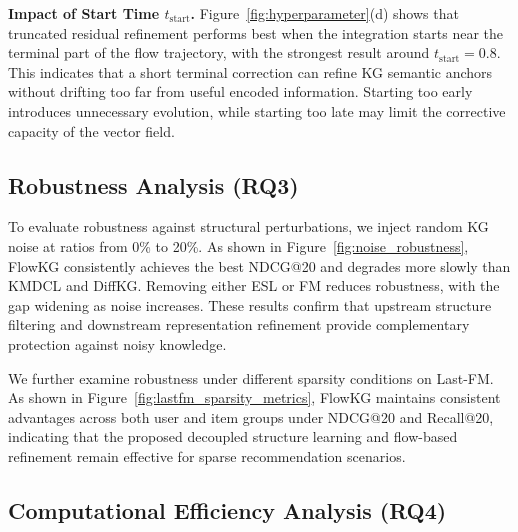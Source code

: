 \noindent\textbf{Impact of Start Time $t_{\mathrm{start}}$.}
Figure~\ref{fig:hyperparameter}(d) shows that truncated residual refinement performs best when the integration starts near the terminal part of the flow trajectory, with the strongest result around $t_{\mathrm{start}}=0.8$. This indicates that a short terminal correction can refine KG semantic anchors without drifting too far from useful encoded information. Starting too early introduces unnecessary evolution, while starting too late may limit the corrective capacity of the vector field.

\subsection{Robustness Analysis (RQ3)}


To evaluate robustness against structural perturbations, we inject random KG noise at ratios from 0\% to 20\%. As shown in Figure~\ref{fig:noise_robustness}, FlowKG consistently achieves the best NDCG@20 and degrades more slowly than KMDCL and DiffKG. Removing either ESL or FM reduces robustness, with the gap widening as noise increases. These results confirm that upstream structure filtering and downstream representation refinement provide complementary protection against noisy knowledge.

We further examine robustness under different sparsity conditions on Last-FM. As shown in Figure~\ref{fig:lastfm_sparsity_metrics}, FlowKG maintains consistent advantages across both user and item groups under NDCG@20 and Recall@20, indicating that the proposed decoupled structure learning and flow-based refinement remain effective for sparse recommendation scenarios.


\subsection{Computational Efficiency Analysis (RQ4)}



